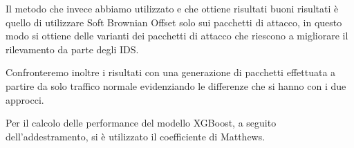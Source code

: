 Il metodo che invece abbiamo utilizzato e che  ottiene risultati buoni risultati è quello di utilizzare Soft Brownian Offset solo sui pacchetti di attacco, in questo modo si ottiene delle varianti dei pacchetti di attacco che riescono a migliorare il rilevamento da parte degli IDS.

Confronteremo inoltre i risultati con una generazione di pacchetti effettuata a partire da solo traffico normale evidenziando le differenze che si hanno con i due approcci.

Per il calcolo delle performance del modello XGBoost, a seguito dell'addestramento, si è utilizzato il coefficiente di Matthews.



%
%
%
%
%
%
%
